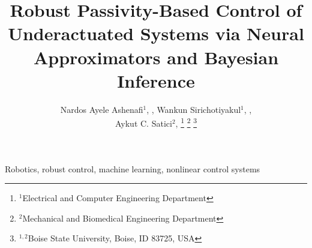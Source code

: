 \documentclass[journal,twoside,web]{ieeecolor}  %
\title{\LARGE \bf
Robust Passivity-Based Control of Underactuated Systems via %
Neural Approximators and Bayesian Inference
}
\author{Nardos Ayele Ashenafi$^{1}$, \IEEEmembership{Student Member, IEEE}, Wankun Sirichotiyakul$^{1}$, \IEEEmembership{Student Member, IEEE}, \\
        Aykut C. Satici$^{2}$, \IEEEmembership{Member, IEEE}%
\thanks{$^{1}$Electrical and Computer Engineering Department
        }%
\thanks{$^{2}$Mechanical and Biomedical Engineering Department
        }%
\thanks{$^{1, 2}$Boise State University, Boise, ID 83725, USA}
}
\begin{document}
\maketitle
\thispagestyle{empty}

\begin{IEEEkeywords}
        Robotics, robust control, machine learning, nonlinear control systems
\end{IEEEkeywords}





                           




        
 
\end{document}

